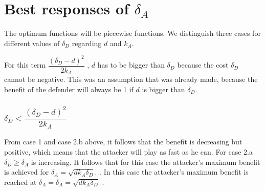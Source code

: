 %
%
%


\section{Best responses of $\delta_{A}$}
The optimum functions will be piecewise functions. We distinguish three cases for different values of $\delta_{D}$ regarding $d$ and $k_{A}$. 


For this term $\dfrac{(\delta_{D}-d)^{2}}{2k_{A}} $ , $d$ has to be bigger than  $\delta_{D}$ because the cost $\delta_{D}$ cannot be negative. This was an assumption that was already made, because the benefit of the defender will always be 1 if $d$ is bigger than  $\delta_{D}$.

\subsubsection*{$\delta_{D} < \dfrac{(\delta_{D}-d)^{2}}{2k_{A}}$} 
From case 1 and case 2.b above, it follows that the benefit is decreasing but positive, which means that the attacker will play as fast as he can. For case 2.a  $\delta_{D} \geq \delta_{A}$ is increasing. It follows that for this case the attacker's maximum benefit is achieved for $\delta_{A} = \sqrt{d k_{A}\delta_{D}}$.
. In this case the attacker's maximum benefit is reached at $\delta_{A} = \delta_{A} = \sqrt{dk_{A}\delta_{D}}$  .

